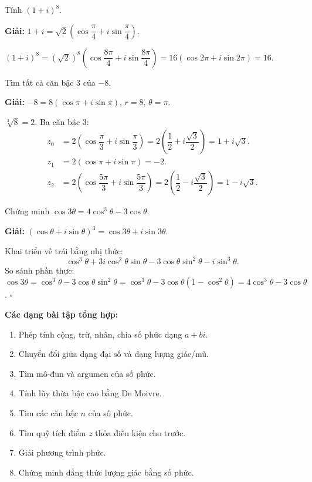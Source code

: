 \documentclass[12pt,a4paper]{article}
\begin{document}
\begin{vidu}
  Tính $(1 + i)^8$.

  \medskip\textbf{Giải:}
  $1 + i = \sqrt{2}\!\left(\cos\dfrac{\pi}{4} + i\sin\dfrac{\pi}{4}\right)$.

  $(1+i)^8 = (\sqrt{2})^8\!\left(\cos\dfrac{8\pi}{4} + i\sin\dfrac{8\pi}{4}\right) = 16(\cos 2\pi + i\sin 2\pi) = 16$.
\end{vidu}

\begin{vidu}
  Tìm tất cả căn bậc 3 của $-8$.

  \medskip\textbf{Giải:}
  $-8 = 8(\cos\pi + i\sin\pi)$, $r = 8$, $\theta = \pi$.

  $\sqrt[3]{8} = 2$. Ba căn bậc 3:
  \begin{align*}
    z_0 &= 2\!\left(\cos\dfrac{\pi}{3} + i\sin\dfrac{\pi}{3}\right) = 2\!\left(\dfrac{1}{2} + i\dfrac{\sqrt{3}}{2}\right) = 1 + i\sqrt{3}. \\
    z_1 &= 2\!\left(\cos\pi + i\sin\pi\right) = -2. \\
    z_2 &= 2\!\left(\cos\dfrac{5\pi}{3} + i\sin\dfrac{5\pi}{3}\right) = 2\!\left(\dfrac{1}{2} - i\dfrac{\sqrt{3}}{2}\right) = 1 - i\sqrt{3}.
  \end{align*}
\end{vidu}

\begin{vidu}[title={Ứng dụng De Moivre: Chứng minh đẳng thức lượng giác}]
  Chứng minh $\cos 3\theta = 4\cos^3\theta - 3\cos\theta$.

  \medskip\textbf{Giải:}
  $(\cos\theta + i\sin\theta)^3 = \cos 3\theta + i\sin 3\theta$.

  Khai triển vế trái bằng nhị thức:
  \[
    \cos^3\theta + 3i\cos^2\theta\sin\theta - 3\cos\theta\sin^2\theta - i\sin^3\theta.
  \]
  So sánh phần thực: $\cos 3\theta = \cos^3\theta - 3\cos\theta\sin^2\theta = \cos^3\theta - 3\cos\theta(1-\cos^2\theta) = 4\cos^3\theta - 3\cos\theta$. $\square$
\end{vidu}

\medskip\noindent\textbf{Các dạng bài tập tổng hợp:}
\begin{enumerate}[label=\textbf{Dạng \arabic*:}, leftmargin=*, align=left]
  \item Phép tính cộng, trừ, nhân, chia số phức dạng $a + bi$.
  \item Chuyển đổi giữa dạng đại số và dạng lượng giác/mũ.
  \item Tìm mô-đun và argumen của số phức.
  \item Tính lũy thừa bậc cao bằng De Moivre.
  \item Tìm các căn bậc $n$ của số phức.
  \item Tìm quỹ tích điểm $z$ thỏa điều kiện cho trước.
  \item Giải phương trình phức.
  \item Chứng minh đẳng thức lượng giác bằng số phức.
\end{enumerate}
\end{document}
